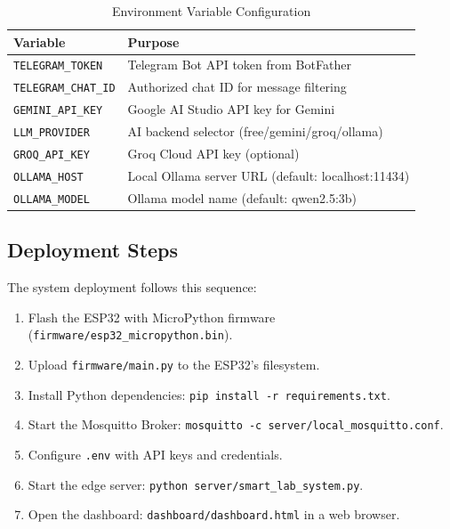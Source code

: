 \documentclass[12pt,a4paper]{report}
\begin{document}
\begin{table}[H]
    \centering
    \begin{tabular}{|l|p{8cm}|}
        \hline
        \textbf{Variable} & \textbf{Purpose} \\ \hline
        \texttt{TELEGRAM\_TOKEN} & Telegram Bot API token from BotFather \\ \hline
        \texttt{TELEGRAM\_CHAT\_ID} & Authorized chat ID for message filtering \\ \hline
        \texttt{GEMINI\_API\_KEY} & Google AI Studio API key for Gemini \\ \hline
        \texttt{LLM\_PROVIDER} & AI backend selector (free/gemini/groq/ollama) \\ \hline
        \texttt{GROQ\_API\_KEY} & Groq Cloud API key (optional) \\ \hline
        \texttt{OLLAMA\_HOST} & Local Ollama server URL (default: localhost:11434) \\ \hline
        \texttt{OLLAMA\_MODEL} & Ollama model name (default: qwen2.5:3b) \\ \hline
    \end{tabular}
    \caption{Environment Variable Configuration}
    \label{tab:env_vars}
\end{table}

\subsection{Deployment Steps}
The system deployment follows this sequence:
\begin{enumerate}
    \item Flash the ESP32 with MicroPython firmware (\texttt{firmware/esp32\_micropython.bin}).
    \item Upload \texttt{firmware/main.py} to the ESP32's filesystem.
    \item Install Python dependencies: \texttt{pip install -r requirements.txt}.
    \item Start the Mosquitto Broker: \texttt{mosquitto -c server/local\_mosquitto.conf}.
    \item Configure \texttt{.env} with API keys and credentials.
    \item Start the edge server: \texttt{python server/smart\_lab\_system.py}.
    \item Open the dashboard: \texttt{dashboard/dashboard.html} in a web browser.
\end{enumerate}


\end{document}
